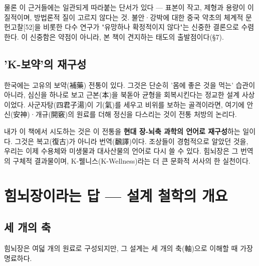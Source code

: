 \documentclass[11pt,oneside]{book}
\begin{document}
물론 이 근거들에는 일관되게 따라붙는 단서가 있다 — 표본이 작고, 제형과 용량이 이질적이며, 방법론적 질이 고르지 않다는 것. 불안·강박에 대한 중국 약초의 체계적 문헌고찰[52]을 비롯한 다수 연구가 "유망하나 확정적이지 않다"는 신중한 결론으로 수렴한다. 이 신중함은 약점이 아니라, 본 책이 견지하는 태도의 출발점이다(§7).

\subsection{'K-보약'의 재구성}
한국에는 고유의 보약(補藥) 전통이 있다. 그것은 단순히 '몸에 좋은 것을 먹는' 습관이 아니라, 심신을 하나로 보고 근본(本)을 북돋아 균형을 회복시킨다는 정교한 설계 사상이었다. 사군자탕(四君子湯)이 기(氣)를 세우고 비위를 보하는 골격이라면, 여기에 안신(安神)·개규(開竅)의 원료를 더해 정신을 다스리는 것이 전통 처방의 논리다.

내가 이 책에서 시도하는 것은 이 전통을 \textbf{현대 장-뇌축 과학의 언어로 재구성}하는 일이다. 그것은 복고(復古)가 아니라 번역(飜譯)이다. 조상들이 경험적으로 알았던 것을, 우리는 이제 수용체와 미생물과 대사산물의 언어로 다시 쓸 수 있다. 힘뇌장은 그 번역의 구체적 결과물이며, K-웰니스(K-Wellness)라는 더 큰 문화적 서사의 한 실천이다.

\section{힘뇌장이라는 답 — 설계 철학의 개요}
\subsection{세 개의 축}
힘뇌장은 여덟 개의 원료로 구성되지만, 그 설계는 세 개의 축(軸)으로 이해할 때 가장 명료하다.

\vspace{2pt}\vspace{3pt}
\end{document}
